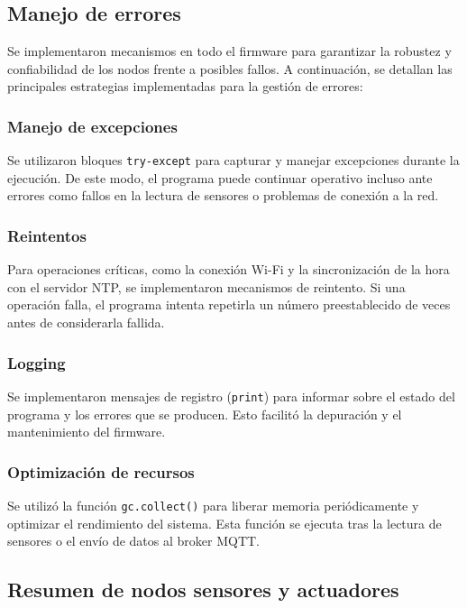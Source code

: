 \subsection{Manejo de errores}

Se implementaron mecanismos en todo el firmware para garantizar la robustez y
confiabilidad de los nodos frente a posibles fallos. A continuación, se
detallan las principales estrategias implementadas para la gestión de errores:

\subsubsection{Manejo de excepciones}

Se utilizaron bloques \texttt{try-except} para capturar y manejar excepciones
durante la ejecución. De este modo, el programa puede continuar operativo
incluso ante errores como fallos en la lectura de sensores o problemas de
conexión a la red.

\subsubsection{Reintentos}

Para operaciones críticas, como la conexión Wi-Fi y la sincronización de la
hora con el servidor NTP, se implementaron mecanismos de reintento. Si una
operación falla, el programa intenta repetirla un número preestablecido de
veces antes de considerarla fallida.

\subsubsection{Logging}

Se implementaron mensajes de registro (\texttt{print}) para informar sobre el
estado del programa y los errores que se producen. Esto facilitó la depuración
y el mantenimiento del firmware.

\subsubsection{Optimización de recursos}

Se utilizó la función \texttt{gc.collect()} para liberar memoria periódicamente
y optimizar el rendimiento del sistema. Esta función se ejecuta tras la lectura
de sensores o el envío de datos al broker MQTT.

\subsection{Resumen de nodos sensores y actuadores}

